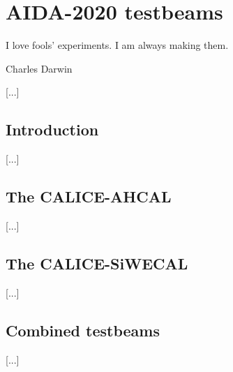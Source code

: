 \chapter{AIDA-2020 testbeams}

\epigraph{I love fools' experiments. I am always making them.}{Charles Darwin}

[...]

\section{Introduction}
[...]

\section{The CALICE-AHCAL}
[...]

\section{The CALICE-SiWECAL}
[...]

\section{Combined testbeams}
[...]